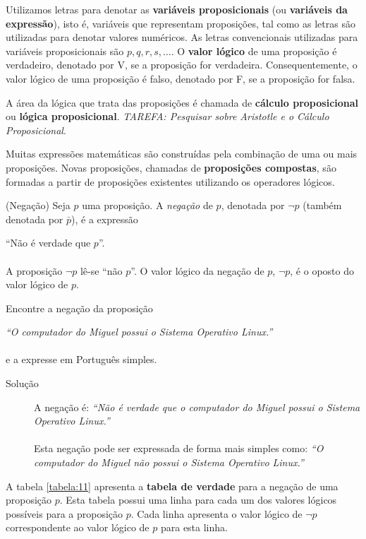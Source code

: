 Utilizamos letras para denotar as \textbf{variáveis proposicionais} (ou
\textbf{variáveis da expressão}), isto é, variáveis que representam proposições,
tal como as letras são utilizadas para denotar valores numéricos. As letras
convencionais utilizadas para variáveis proposicionais são $p, q, r, s, \ldots$.
O \textbf{valor lógico} de uma proposição é verdadeiro, denotado por V, se a
proposição for verdadeira. Consequentemente, o valor lógico de uma
proposição é falso, denotado por F, se a proposição for falsa.

A área da lógica que trata das proposições é chamada de \textbf{cálculo
proposicional} ou \textbf{lógica proposicional}. \emph{TAREFA: Pesquisar sobre
Aristotle e o Cálculo Proposicional}.

Muitas expressões matemáticas são construídas pela combinação de uma ou mais
proposições. Novas proposições, chamadas de \textbf{proposições compostas}, são
formadas a partir de proposições existentes utilizando os operadores lógicos.

\begin{defn}\label{def11}(Negação) Seja $p$ uma proposição. A
\emph{negação} de $p$, denotada por $\lnot p$ (também denotada por $\bar{p}$),
é a expressão\end{defn}

``Não é verdade que $p$''.\\ \\
A proposição $\lnot p$ lê-se ``não $p$''. O valor lógico da negação de $p$,
$\lnot p$, é o oposto do valor lógico de $p$.

\label{exem13}
\begin{exmp}Encontre a negação da proposição\end{exmp}
\emph{``O computador do Miguel possui o Sistema Operativo Linux.''}\\ \\
e a expresse em Português simples.

\begin{description}
\item[Solução] A negação é: \emph{``Não é verdade que o computador do Miguel
possui o Sistema Operativo Linux.''}\\ \\
Esta negação pode ser expressada de forma mais simples como: \emph{``O
computador do Miguel não possui o Sistema Operativo Linux.''}
\end{description}


A tabela \ref{tabela:11} apresenta a \textbf{tabela de verdade} para a negação
de uma proposição $p$. Esta tabela possui uma linha para cada um dos valores
lógicos possíveis para a proposição $p$. Cada linha apresenta o valor lógico de
$\lnot p$ correspondente ao valor lógico de $p$ para esta linha.

